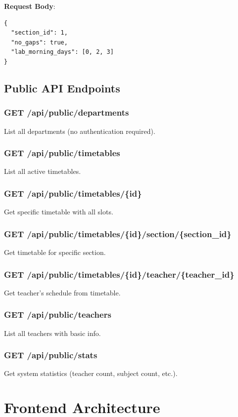 \documentclass[12pt,a4paper]{article}
\begin{document}
\textbf{Request Body}:
\begin{verbatim}
{
  "section_id": 1,
  "no_gaps": true,
  "lab_morning_days": [0, 2, 3]
}
\end{verbatim}


\subsection{Public API Endpoints}

\subsubsection{GET /api/public/departments}
List all departments (no authentication required).

\subsubsection{GET /api/public/timetables}
List all active timetables.

\subsubsection{GET /api/public/timetables/\{id\}}
Get specific timetable with all slots.

\subsubsection{GET /api/public/timetables/\{id\}/section/\{section\_id\}}
Get timetable for specific section.

\subsubsection{GET /api/public/timetables/\{id\}/teacher/\{teacher\_id\}}
Get teacher's schedule from timetable.

\subsubsection{GET /api/public/teachers}
List all teachers with basic info.

\subsubsection{GET /api/public/stats}
Get system statistics (teacher count, subject count, etc.).

\section{Frontend Architecture}
\end{document}
